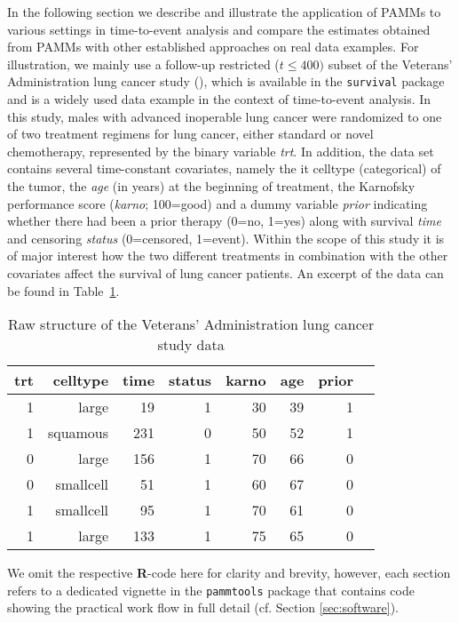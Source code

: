 \documentclass[submit]{smj}
\newcommand{\Rlang}{\textbf{\textsf{R}}}
\newcommand{\code}[1]{{\small \texttt{#1}}}
\begin{document}
In the following section we describe and illustrate the application of PAMMs
to various settings in time-to-event analysis
and compare the estimates obtained from PAMMs with other established approaches on real data examples.
For illustration, we mainly use a follow-up restricted ($t\leq 400)$ subset of the
Veterans' Administration lung cancer study (\citealp{KalPre:80}),
which is available in the \texttt{survival} \citep{The:2015} package and is a widely used data example in the context of time-to-event analysis.
In this study, males with advanced inoperable lung cancer were randomized to one
of two treatment regimens for lung cancer, either standard or novel chemotherapy,
represented by the binary variable {\it trt}. In addition, the data set contains
several time-constant covariates, namely the {\-it celltype} (categorical) of the
tumor, the {\it age} (in years) at the beginning of treatment, the Karnofsky
performance score ({\it karno}; 100=good) and a dummy variable {\it prior}
indicating whether there had been a prior therapy (0=no, 1=yes) along with
survival {\it time} and censoring {\it status} (0=censored, 1=event). Within the scope of this study it is of major interest
how the two different treatments in combination with the other covariates affect the survival of lung cancer patients. An excerpt
of the data can be found in Table~\ref{tab:vet:raw}.

\begin{table}[ht]
\centering
\caption{Raw structure of the Veterans' Administration lung cancer study data}
\label{tab:vet:raw}
\vspace{5pt}
\begin{tabular}{rrrrrrrr}
  \hline
trt & celltype  & time & status & karno & age & prior \\
\hline
1   & large     & 19   & 1      & 30    & 39  & 1 \\
1   & squamous  & 231  & 0      & 50    & 52  & 1 \\
0   & large     & 156  & 1      & 70    & 66  & 0 \\
0   & smallcell & 51   & 1      & 60    & 67  & 0 \\
1   & smallcell & 95   & 1      & 70    & 61  & 0 \\
1   & large     & 133  & 1      & 75    & 65  & 0 \\
   \hline
\end{tabular}\end{table}

We omit the respective \Rlang-code here for clarity and brevity, however,
each section refers to a dedicated vignette in the \code{pammtools} package that
contains code showing the practical work flow in full detail
(cf. Section \ref{sec:software}).
\end{document}
